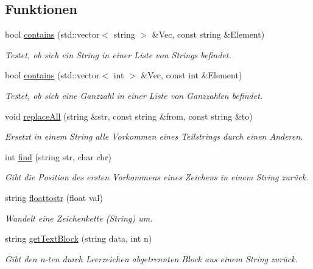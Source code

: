\subsection*{Funktionen}
\begin{DoxyCompactItemize}
\item 
bool \hyperlink{namespaceODiSIToSD_a0196aa9f8fa3ef1c56432305918c6129}{contains} (std\-::vector$<$ string $>$ \&Vec, const string \&Element)
\begin{DoxyCompactList}\small\item\em Testet, ob sich ein String in einer Liste von Strings befindet. \end{DoxyCompactList}\item 
bool \hyperlink{namespaceODiSIToSD_adc00a4a6a36292e9dbe72a2d9eb7d447}{contains} (std\-::vector$<$ int $>$ \&Vec, const int \&Element)
\begin{DoxyCompactList}\small\item\em Testet, ob sich eine Ganzzahl in einer Liste von Ganzzahlen befindet. \end{DoxyCompactList}\item 
void \hyperlink{namespaceODiSIToSD_ac5bc435a72dccec2fc50bb187298f0e8}{replace\-All} (string \&str, const string \&from, const string \&to)
\begin{DoxyCompactList}\small\item\em Ersetzt in einem String alle Vorkommen eines Teilstrings durch einen Anderen. \end{DoxyCompactList}\item 
int \hyperlink{namespaceODiSIToSD_a2978e21c2e0b6ff70786de2d92aed3ee}{find} (string str, char chr)
\begin{DoxyCompactList}\small\item\em Gibt die Position des ersten Vorkommens eines Zeichens in einem String zurück. \end{DoxyCompactList}\item 
string \hyperlink{namespaceODiSIToSD_af546c680cd566e162094b910dfa03452}{floattostr} (float val)
\begin{DoxyCompactList}\small\item\em Wandelt eine Zeichenkette (String) um. \end{DoxyCompactList}\item 
string \hyperlink{namespaceODiSIToSD_a60fe9a380b9b9f2e401ae0aca1f6b87a}{get\-Text\-Block} (string data, int n)
\begin{DoxyCompactList}\small\item\em Gibt den n-\/ten durch Leerzeichen abgetrennten Block aus einem String zurück. \end{DoxyCompactList}\item 

\end{DoxyCompactItemize}
